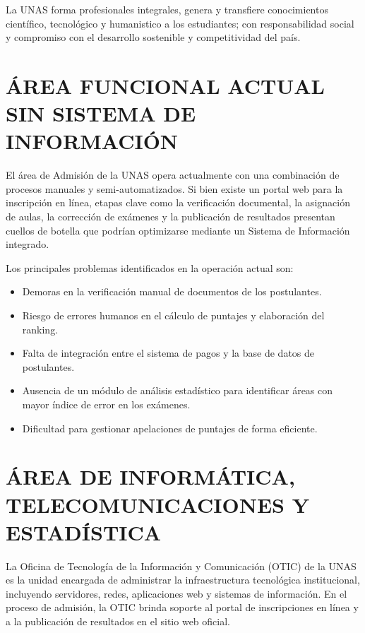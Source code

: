 \documentclass[12pt, a4paper]{report}
\begin{document}
La UNAS forma profesionales integrales, genera y transfiere conocimientos científico, tecnológico y humanistico a los estudiantes; con responsabilidad social y compromiso con el desarrollo sostenible y competitividad del país.

\section{ÁREA FUNCIONAL ACTUAL SIN SISTEMA DE INFORMACIÓN}

El área de Admisión de la UNAS opera actualmente con una combinación de procesos manuales y semi-automatizados. Si bien existe un portal web para la inscripción en línea, etapas clave como la verificación documental, la asignación de aulas, la corrección de exámenes y la publicación de resultados presentan cuellos de botella que podrían optimizarse mediante un Sistema de Información integrado.

Los principales problemas identificados en la operación actual son:

\begin{itemize}[noitemsep]
  \item Demoras en la verificación manual de documentos de los postulantes.
  \item Riesgo de errores humanos en el cálculo de puntajes y elaboración del ranking.
  \item Falta de integración entre el sistema de pagos y la base de datos de postulantes.
  \item Ausencia de un módulo de análisis estadístico para identificar áreas con mayor índice de error en los exámenes.
  \item Dificultad para gestionar apelaciones de puntajes de forma eficiente.
\end{itemize}

\section{ÁREA DE INFORMÁTICA, TELECOMUNICACIONES Y ESTADÍSTICA}

La Oficina de Tecnología de la Información y Comunicación (OTIC) de la UNAS es la unidad encargada de administrar la infraestructura tecnológica institucional, incluyendo servidores, redes, aplicaciones web y sistemas de información. En el proceso de admisión, la OTIC brinda soporte al portal de inscripciones en línea y a la publicación de resultados en el sitio web oficial.
\end{document}
